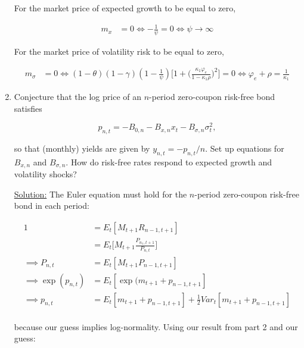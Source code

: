 \documentclass{article}
\begin{document}
\begin{enumerate}
For the market price of expected growth to be equal to zero,

\begin{align*}
m_x &= 0
\iff -\frac{1}{\psi} = 0
\iff \psi \to \infty
\end{align*}

For the market price of volatility risk to be equal to zero,

\begin{align*}
m_\sigma &= 0
\iff
(1-\theta)(1-\gamma)(1 - \frac{1}{\psi})\Bigg[1 + \Big(\frac{\kappa_1 \varphi_e}{1 - \kappa_1 \rho}\Big)^2 \Bigg] = 0 
\iff
\varphi_e + \rho= \frac{1}{\kappa_1}
\end{align*}

\pagebreak

\item Conjecture that the log price of an $n$-period zero-coupon risk-free bond satisfies

$$
p_{n,t} = - B_{0, n} - B_{x,n} x_t - B_{\sigma,n} \sigma_t^2,
$$

so that (monthly) yields are given by $y_{n,t} = -p_{n,t}/n$. Set up equations for $B_{x,n}$ and $B_{\sigma,n}$. How do risk-free rates respond to expected growth and volatility shocks?

\bigskip

\underline{Solution:}  The Euler equation must hold for the $n$-period zero-coupon risk-free bond in each period:

\begin{align*}
1 &= E_t[M_{t+1} R_{n-1,t+1}] \\ 
&= E_t\Bigg[M_{t+1} \frac{P_{n_1,t+1}}{P_{n, t}}\Bigg]\\
\implies
P_{n, t} &= E_t [ M_{t+1} P_{n-1,t+1} ] \\
\implies
\exp(p_{n,t}) &= E_t[\exp(m_{t+1} + p_{n-1,t+1}] \\
\implies
p_{n,t} &= E_t[m_{t+1} + p_{n-1,t+1}] + \frac{1}{2} Var_t[m_{t+1} + p_{n-1,t+1}] \\
\end{align*}

because our guess implies log-normality. Using our result from part 2 and our guess:


\end{enumerate}
\end{document}
